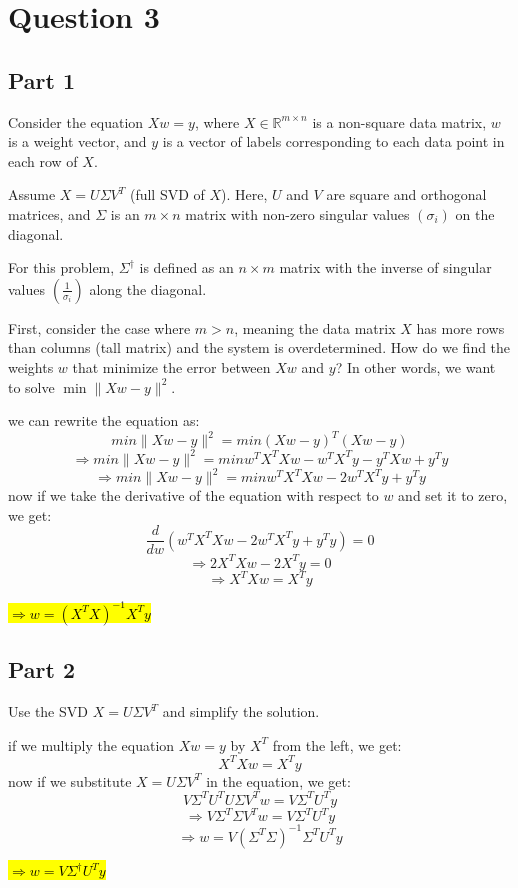 \section{Question 3}
\subsection{Part 1}
Consider the equation \( Xw = y \), where \( X \in \mathbb{R}^{m \times n} \) is a non-square data matrix, \( w \) is a weight vector, and \( y \) is a vector of labels corresponding to each data point in each row of \( X \).

Assume \( X = U \Sigma V^T \) (full SVD of \( X \)). Here, \( U \) and \( V \) are square and orthogonal matrices, and \( \Sigma \) is an \( m \times n \) matrix with non-zero singular values \( (\sigma_i) \) on the diagonal.

For this problem, \( \Sigma^\dagger \) is defined as an \( n \times m \) matrix with the inverse of singular values \( \left(\frac{1}{\sigma_i}\right) \) along the diagonal.

First, consider the case where \( m > n \), meaning the data matrix \( X \) has more rows than columns (tall matrix) and the system is overdetermined. How do we find the weights \( w \) that minimize the error between \( Xw \) and \( y \)? In other words, we want to solve \( \min \| Xw - y \|^2 \).
\begin{qsolve}
	\begin{qsolve}[]
		we can rewrite the equation as:
		$$min \| Xw - y \|^2 = min (Xw - y)^T (Xw - y)$$
		$$\Rightarrow min \| Xw - y \|^2 = min w^T X^T X w - w^T X^T y - y^T X w + y^T y$$
		$$\Rightarrow min \| Xw - y \|^2 = min w^T X^T X w - 2 w^T X^T y + y^T y$$
		now if we take the derivative of the equation with respect to \(w\) and set it to zero, we get:
		$$\frac{d}{dw} (w^T X^T X w - 2 w^T X^T y + y^T y) = 0$$
		$$\Rightarrow 2 X^T X w - 2 X^T y = 0$$
		$$\Rightarrow X^T X w = X^T y$$
		\begin{center}
			\hl{$\Rightarrow w = (X^T X)^{-1} X^T y$}
		\end{center}
	\end{qsolve}
\end{qsolve}
\subsection{Part 2}
Use the SVD \( X = U \Sigma V^T \) and simplify the solution.
\begin{qsolve}
	\begin{qsolve}[]
		if we multiply the equation \(Xw = y\) by $X^T$ from the left, we get:
		$$X^T X w = X^T y$$
		now if we substitute \(X = U \Sigma V^T\) in the equation, we get:
		$$V \Sigma^T U^T U \Sigma V^T w = V \Sigma^T U^T y$$
		\splitqsolve[\splitqsolve]
		$$ \Rightarrow V \Sigma^T \Sigma V^T w = V \Sigma^T U^T y$$
		$$ \Rightarrow w = V (\Sigma^T \Sigma)^{-1} \Sigma^T U^T y$$
		\begin{center}
			\hl{$\Rightarrow w = V \Sigma^{\dagger} U^T y$}
		\end{center}
	\end{qsolve}
\end{qsolve}
